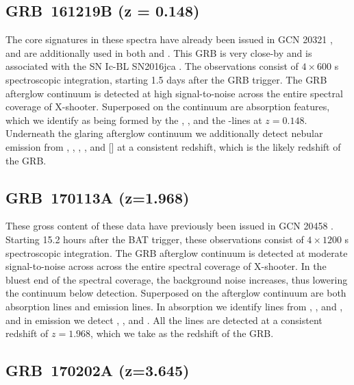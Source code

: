 \documentclass[longauth]{aa}    %
\begin{document}
\subsection{GRB~161219B (z = 0.148)}\label{161219}

The core signatures in these spectra have already been issued in GCN 20321
\citep{GCN20321}, and are additionally used in both \citet{Ashall2017} and
\citet{Cano2017}. This GRB is very close-by and is associated with the SN
Ic-BL SN2016jca \citep[GCN 20342;][]{GCN20342}. The observations consist of $4
\times 600$ s spectroscopic integration, starting 1.5 days after the GRB
trigger. The GRB afterglow continuum is detected at high signal-to-noise across
the entire spectral coverage of X-shooter. Superposed on the continuum are
absorption features, which we identify as being formed by the \mgii, \mgi, and
the \cahk-lines at $z = 0.148$. Underneath the glaring afterglow continuum we
additionally detect nebular emission from \oii, \hb, \oiii, \ha, and [\sii] at a
consistent redshift, which is the likely redshift of the GRB.


\subsection{GRB~170113A (z=1.968)}\label{170113}

These gross content of these data have previously been issued in GCN 20458
\citep{GCN20458}. Starting 15.2 hours after the BAT trigger, these observations
consist of $4 \times 1200$ s spectroscopic integration. The GRB afterglow
continuum is detected at moderate signal-to-noise across across the entire
spectral coverage of X-shooter. In the bluest end of the spectral coverage, the
background noise increases, thus lowering the continuum below detection.
Superposed on the afterglow continuum are both absorption lines and emission
lines. In absorption we identify lines from \SIii, \feii, and \mgii, and in
emission we detect \oii, \hb, and \oiii. All the lines are detected at a
consistent redshift of $z=1.968$, which we take as the redshift of the GRB.

\subsection{GRB~170202A (z=3.645)}\label{170202}
\end{document}
